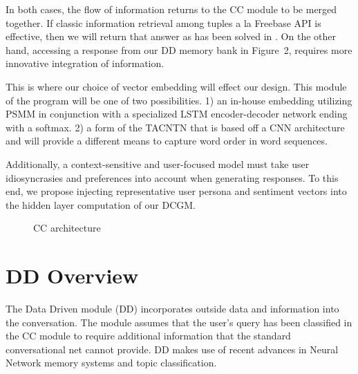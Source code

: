 \documentclass[10pt,twoside,twocolumn]{article}
\begin{document}
\noindent
In both cases, the flow of information returns to the CC module to be merged together. If classic information retrieval among tuples a la Freebase API is effective, then we will return that answer as has been solved in \cite{Iyyer2014, Yao2014a, Yao2014b}. On the other hand, accessing a response from our DD memory bank in Figure~2, requires more innovative integration of information.

\noindent
This is where our choice of vector embedding will effect our design. This module of the program will be one of two possibilities. 1) an in-house embedding utilizing PSMM \cite{Merity2016} in conjunction with a specialized LSTM encoder-decoder network ending with a softmax. 2) a form of the TACNTN \cite{Wu} that is based off a CNN architecture and will provide a different means to capture word order in word sequences.

\noindent
Additionally, a context-sensitive and user-focused model must take user idiosyncrasies and preferences into account when generating responses. To this end, we propose injecting representative user persona and sentiment vectors into the hidden layer computation of our DCGM. 

\begin{figure}[H]
    \centering
    
    \label{CCdesign}
    \caption{CC architecture}
\end{figure}

\section{DD Overview}
The Data Driven module (DD) incorporates outside data and information into the conversation. The module assumes that the user's query has been classified in the CC module to require additional information that the standard conversational net cannot provide. DD makes use of recent advances in Neural Network memory systems and topic classification.
\end{document}
